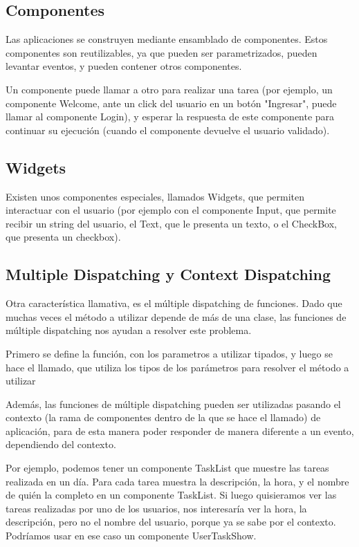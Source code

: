 \subsection{Componentes}
\label{sub-comp}

Las aplicaciones se construyen mediante ensamblado de componentes. Estos componentes son reutilizables,
ya que pueden ser parametrizados, pueden levantar eventos, y pueden contener otros componentes.

Un componente puede llamar a otro para realizar una tarea (por ejemplo, un componente Welcome, ante un click
del usuario en un botón "Ingresar", puede llamar al componente Login), y esperar la respuesta de este
componente para continuar su ejecución (cuando el componente devuelve el usuario validado).
\subsection{Widgets}
\label{sub-widget}

Existen unos componentes especiales, llamados Widgets, que permiten interactuar con el usuario (por ejemplo
con el componente Input, que permite recibir un string del usuario, el Text, que le presenta un texto, o el
CheckBox, que presenta un checkbox).

\subsection{Multiple Dispatching y Context Dispatching}
\label{sub-dispatch}
Otra característica llamativa, es el múltiple dispatching de funciones.
Dado que muchas veces el método a utilizar depende de más de una clase, las funciones de múltiple dispatching nos ayudan a resolver este problema.

Primero se define la función, con los parametros a utilizar tipados, y luego se hace el llamado, que utiliza los tipos de los parámetros para
resolver el método a utilizar

Además, las funciones de múltiple dispatching pueden ser utilizadas pasando el contexto (la rama de componentes dentro de la que se hace el llamado)
de aplicación, para de esta manera poder responder de manera diferente a un evento, dependiendo del contexto.

Por ejemplo, podemos tener un componente TaskList que muestre las tareas realizada en un día. Para cada tarea muestra la descripción, la hora, y el
nombre de quién la completo en un componente TaskList. Si luego quisieramos ver las tareas realizadas por uno de los usuarios, nos interesaría ver
la hora, la descripción, pero no el nombre del usuario, porque ya se sabe por el contexto. Podríamos usar en ese caso un componente UserTaskShow.


